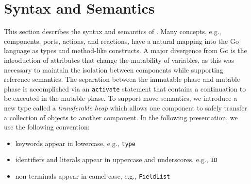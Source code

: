 
\section{Syntax and Semantics}

This section describes the syntax and semantics of \rcgo{}.
Many concepts, e.g., components, ports, actions, and reactions, have a natural mapping into the Go language as types and method-like constructs.
A major divergence from Go is the introduction of attributes that change the mutability of variables, as this was necessary to maintain the isolation between components while supporting reference semantics.
The separation between the immutable phase and mutable phase is accomplished via an \verb+activate+ statement that contains a continuation to be executed in the mutable phase.
To support move semantics, we introduce a new type called a \emph{transferable heap} which allows one component to safely transfer a collection of objects to another component.
In the following presentation, we use the following convention:
\begin{itemize}
  \item keywords appear in lowercase, e.g., \verb+type+
  \item identifiers and literals appear in uppercase and underscores, e.g., \verb+ID+
  \item non-terminals appear in camel-case, e.g., \verb+FieldList+
\end{itemize}

